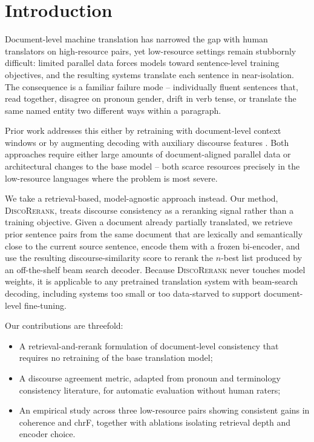 \section{Introduction}

Document-level machine translation has narrowed the gap with human
translators on high-resource pairs, yet low-resource settings remain
stubbornly difficult: limited parallel data forces models toward
sentence-level training objectives, and the resulting systems translate each
sentence in near-isolation. The consequence is a familiar failure mode --
individually fluent sentences that, read together, disagree on pronoun
gender, drift in verb tense, or translate the same named entity two different
ways within a paragraph.

Prior work addresses this either by retraining with document-level context
windows \citep{nakamura2021survey} or by augmenting decoding with auxiliary
discourse features \citep{lindqvist2021probing}. Both approaches require
either large amounts of document-aligned parallel data or architectural
changes to the base model -- both scarce resources precisely in the
low-resource languages where the problem is most severe.

We take a retrieval-based, model-agnostic approach instead. Our method,
\textsc{DiscoRerank}, treats discourse consistency as a reranking signal
rather than a training objective. Given a document already partially
translated, we retrieve prior sentence pairs from the same document that are
lexically and semantically close to the current source sentence, encode them
with a frozen bi-encoder, and use the resulting discourse-similarity score to
rerank the $n$-best list produced by an off-the-shelf beam search decoder.
Because \textsc{DiscoRerank} never touches model weights, it is applicable to
any pretrained translation system with beam-search decoding, including
systems too small or too data-starved to support document-level fine-tuning.

\vspace{2pt}
\noindent Our contributions are threefold:
\begin{itemize}[leftmargin=1.1em,itemsep=1pt,topsep=2pt]
  \item A retrieval-and-rerank formulation of document-level consistency
    that requires no retraining of the base translation model;
  \item A discourse agreement metric, adapted from pronoun and terminology
    consistency literature, for automatic evaluation without human raters;
  \item An empirical study across three low-resource pairs showing
    consistent gains in coherence and chrF, together with ablations
    isolating retrieval depth and encoder choice.
\end{itemize}

